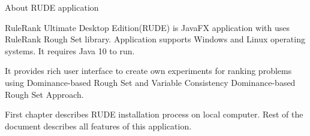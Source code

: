 \begin{Large}
	About RUDE application
\end{Large}
\newline

RuleRank Ultimate Desktop Edition(RUDE) is JavaFX application with uses RuleRank Rough Set library. Application supports Windows and Linux operating systems. It requires Java 10 to run.
\newline

It provides rich user interface to create own experiments for ranking problems using Dominance-based Rough Set and Variable Consistency Dominance-based Rough Set Approach.
\newline

First chapter describes RUDE installation process on local computer. Rest of the document describes all features of this application.

\vfill\newpage
